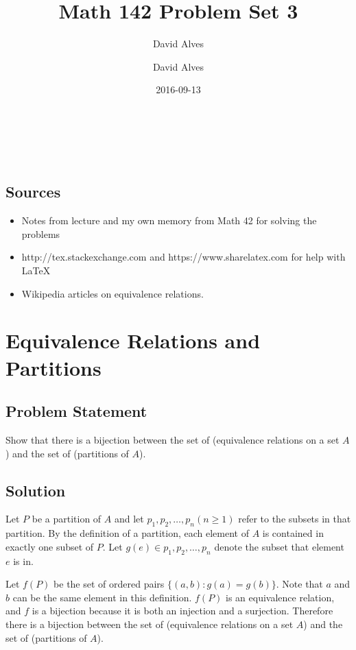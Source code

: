 \documentclass[12pt]{article}
\author{David Alves}
\title{Math 142 Problem Set 3}
\author{David Alves}
\date{2016-09-13}
\begin{document}

\begin{center}
\Large \thetitle \\
\large \theauthor \\
\thedate
\end{center}

\subsection*{Sources}

    \begin{itemize}
    \item Notes from lecture and my own memory from Math 42 for solving the problems
    \item http://tex.stackexchange.com and https://www.sharelatex.com for help with \LaTeX
    \item Wikipedia articles on equivalence relations.
    \end{itemize}

\section{Equivalence Relations and Partitions}

\subsection*{Problem Statement}
Show that there is a bijection between the set of (equivalence relations on a set $A$) and the set of (partitions of $A$). 
\subsection*{Solution}


Let $P$ be a partition of $A$ and let $p_1, p_2, \ldots, p_n (n\geq 1)$ refer to the subsets in that partition. By the definition of a partition, each element of $A$ is contained in exactly one subset of $P$. Let $g(e) \in p_1, p_2, \ldots, p_n$ denote the subset that element $e$ is in.

Let $f(P)$ be the set of ordered pairs $\{(a, b) : g(a) = g(b)\}$. Note that $a$ and $b$ can be the same element in this definition. $f(P)$ is an equivalence relation, and $f$ is a bijection because it is both an injection and a surjection. Therefore there is a bijection between the set of (equivalence relations on a set $A$) and the set of (partitions of $A$).
\end{document}

